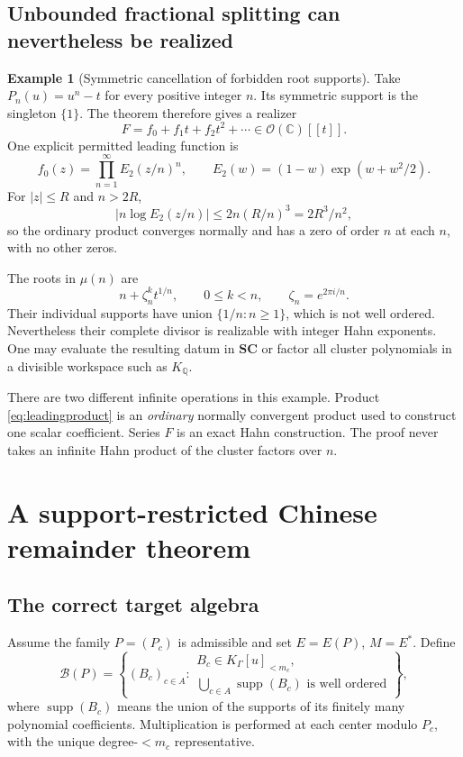 \documentclass[11pt,letterpaper]{article}
\theoremstyle{definition}
\newtheorem{example}[theorem]{Example}
\theoremstyle{remark}
\newcommand{\C}{\mathbb C}
\newcommand{\Q}{\mathbb Q}
\newcommand{\SC}{\mathbf{SC}}
\newcommand{\OO}{\mathcal O}
\newcommand{\KG}{K_\Gamma}
\newcommand{\supp}{\operatorname{supp}}
\newcommand{\BB}{\mathscr B(P)}
\numberwithin{equation}{section}
\begin{document}
\subsection{Unbounded fractional splitting can nevertheless be realized}
\begin{example}[Symmetric cancellation of forbidden root supports]\label{ex:symmetric}
Take $P_n(u)=u^n-t$ for every positive integer $n$. Its symmetric support is the singleton $\{1\}$. The theorem therefore gives a realizer
\[
 F=f_0+f_1t+f_2t^2+\cdots\in\OO(\C)[[t]].
\]
One explicit permitted leading function is
\begin{equation}\label{eq:leadingproduct}
 f_0(z)=\prod_{n=1}^{\infty}E_2(z/n)^n,
 \qquad E_2(w)=(1-w)\exp(w+w^2/2).
\end{equation}
For $|z|\le R$ and $n>2R$,
\[
 \left|n\log E_2(z/n)\right|
 \le 2n(R/n)^3=2R^3/n^2,
\]
so the ordinary product converges normally and has a zero of order $n$ at each $n$, with no other zeros.

The roots in $\mu(n)$ are
\[
 n+\zeta_n^k t^{1/n},\qquad 0\le k<n,
 \qquad \zeta_n=e^{2\pi i/n}.
\]
Their individual supports have union $\{1/n:n\ge1\}$, which is not well ordered. Nevertheless their complete divisor is realizable with integer Hahn exponents. One may evaluate the resulting datum in $\SC$ or factor all cluster polynomials in a divisible workspace such as $K_\Q$.
\end{example}
There are two different infinite operations in this example. Product \eqref{eq:leadingproduct} is an \emph{ordinary} normally convergent product used to construct one scalar coefficient. Series $F$ is an exact Hahn construction. The proof never takes an infinite Hahn product of the cluster factors over $n$.

\section{A support-restricted Chinese remainder theorem}\label{sec:interpolation}

\subsection{The correct target algebra}
Assume the family $P=(P_c)$ is admissible and set $E=E(P)$, $M=E^*$. Define
\begin{equation}\label{eq:restrictedproduct}
 \BB=\left\{(B_c)_{c\in A}:
 \begin{array}{l}
 B_c\in\KG[u]_{<m_c},\\
 \displaystyle\bigcup_{c\in A}\supp(B_c)\text{ is well ordered}
 \end{array}\right\},
\end{equation}
where $\supp(B_c)$ means the union of the supports of its finitely many polynomial coefficients. Multiplication is performed at each center modulo $P_c$, with the unique degree-$<m_c$ representative.
\end{document}
